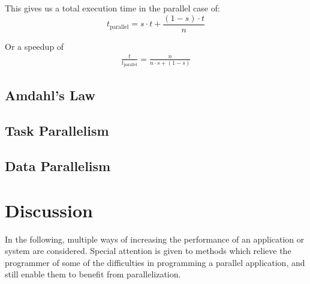 \documentclass[BCOR20mm,DIV14,10pt,headinclude,footexclude,bibtotoc,liststotoc]{article}
\begin{document}
This gives us a total execution time in the parallel case of:
\begin{equation}
	t_\text{parallel} = s \cdot t + \frac{(1-s)\cdot t}{n}
\end{equation}

Or a speedup of
\begin{eqnarray}
	\frac{t}{t_\text{parallel}} = \frac{n}{n \cdot s + (1-s)}
\end{eqnarray}

\begin{figure}
	\centering
	\caption{}
	\label{fig:amdahl}
\end{figure}


\subsection{Amdahl's Law}

\subsection{Task Parallelism}
\subsection{Data Parallelism}


\section{Discussion}

In the following, multiple ways of increasing the performance of an application
or system are considered. Special attention is given to methods which relieve
the programmer of some of the difficulties in programming a parallel
application, and still enable them to benefit from parallelization.

\end{document}

